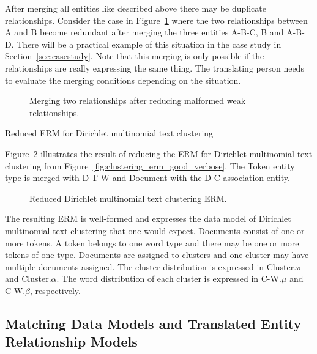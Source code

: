 After merging all entities like described above there may be duplicate relationships. Consider the case in Figure~\ref{fig:erm_reduction_minimal_example} where the two relationships between A and B become redundant after merging the three entities A-B-C, B and A-B-D. There will be a practical example of this situation in the case study in Section~\ref{sec:casestudy}. Note that this merging is only possible if the relationships are really expressing the same thing. The translating person needs to evaluate the merging conditions depending on the situation.

\begin{figure}[t]
\centering
\scalebox{\tikzScale}{\adjustTikzSize }
\caption[Merging two relationships after reducing malformed weak relationships]{Merging two relationships after reducing malformed weak relationships.}\label{fig:erm_reduction_minimal_example}
\end{figure}

\begin{Example}{Reduced ERM for Dirichlet multinomial text clustering}

Figure~\ref{fig:clustering_erm_good_reduced} illustrates the result of reducing the ERM for Dirichlet multinomial text clustering from Figure~\ref{fig:clustering_erm_good_verbose}. The Token entity type is merged with D-T-W and Document with the D-C association entity.

\begin{figure}[h]
\centering
\scalebox{\tikzScale}{\adjustTikzSize }
\caption[Reduced Dirichlet multinomial text clustering ERM]{Reduced Dirichlet multinomial text clustering ERM.}\label{fig:clustering_erm_good_reduced}
\end{figure}

The resulting ERM is well-formed and expresses the data model of Dirichlet multinomial text clustering that one would expect. Documents consist of one or more tokens. A token belongs to one word type and there may be one or more tokens of one type. Documents are assigned to clusters and one cluster may have multiple documents assigned. The cluster distribution is expressed in Cluster.$\pi$ and Cluster.$\alpha$. The word distribution of each cluster is expressed in C-W.$\mu$ and C-W.$\beta$, respectively.

\end{Example}

\subsection{Matching Data Models and Translated Entity Relationship Models}
\label{sec:erm_matching}


